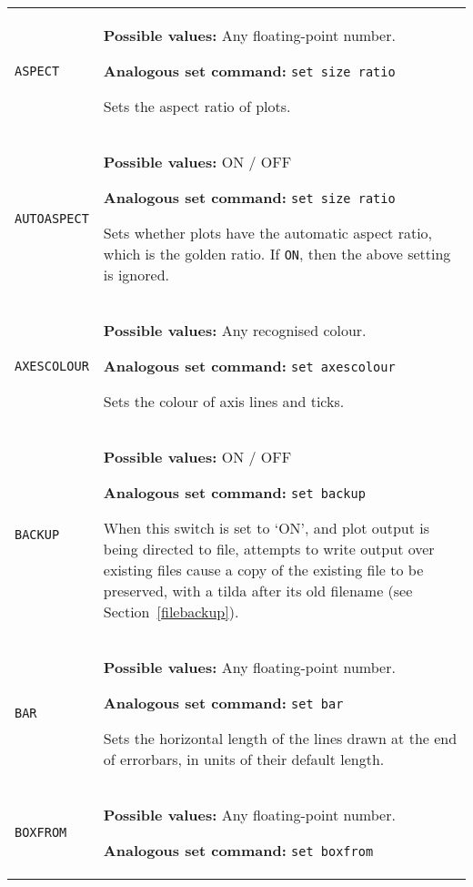 \documentclass[a4paper,onecolumn,11pt]{book}
\begin{document}
\begin{longtable}{p{3.4cm}p{9cm}}
\texttt{ASPECT} & \textbf{Possible values:} Any floating-point number.

                   \textbf{Analogous set command:} \texttt{set size ratio}\index{set size ratio command@\texttt{set size ratio} command}

                   Sets the aspect ratio of plots.
                   \\
\texttt{AUTOASPECT} & \textbf{Possible values:} ON / OFF

                   \textbf{Analogous set command:} \texttt{set size ratio}

                   Sets whether plots have the automatic aspect ratio, which is the golden ratio. If \texttt{ON}, then the above setting is ignored.
                   \\
\texttt{AXESCOLOUR} & \textbf{Possible values:} Any recognised colour.

                   \textbf{Analogous set command:} \texttt{set axescolour}\index{set axescolour command@\texttt{set axescolour} command}

                   Sets the colour of axis lines and ticks.
                   \\
\texttt{BACKUP} & \textbf{Possible values:} ON / OFF

                   \textbf{Analogous set command:} \texttt{set backup}\index{set backup command@\texttt{set backup} command}

                   When this switch is set to `ON', and plot output is being directed to file, attempts to write output over existing files cause a copy of the existing file to be preserved, with a tilda after its old filename (see Section~\ref{filebackup}).
                   \\
\texttt{BAR}     & \textbf{Possible values:}  Any floating-point number.

                   \textbf{Analogous set command:} \texttt{set bar}\index{set bar command@\texttt{set bar} command}

                   Sets the horizontal length of the lines drawn at the end of errorbars, in units of their default length.
                   \\
\texttt{BOXFROM} & \textbf{Possible values:} Any floating-point number.

                   \textbf{Analogous set command:} \texttt{set boxfrom}\index{set boxfrom command@\texttt{set boxfrom} command}


\end{longtable}
\end{document}
